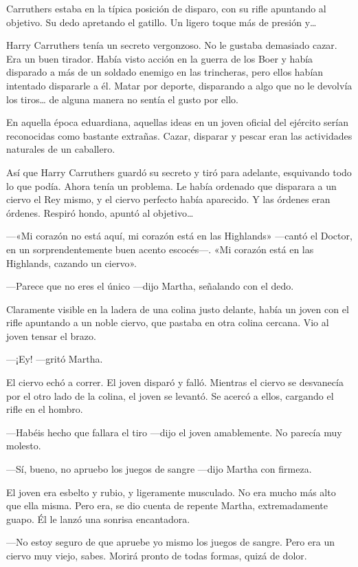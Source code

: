 Carruthers estaba en la típica posición de disparo, con su rifle
apuntando al objetivo. Su dedo apretando el gatillo. Un ligero toque más
de presión y\ldots{}

Harry Carruthers tenía un secreto vergonzoso. No le gustaba demasiado
cazar. Era un buen tirador. Había visto acción en la guerra de los Boer
y había disparado a más de un soldado enemigo en las trincheras, pero
ellos habían intentado dispararle a él. Matar por deporte, disparando a
algo que no le devolvía los tiros\ldots{} de alguna manera no sentía el
gusto por ello.

En aquella época eduardiana, aquellas ideas en un joven oficial del
ejército serían reconocidas como bastante extrañas. Cazar, disparar y
pescar eran las actividades naturales de un caballero.

Así que Harry Carruthers guardó su secreto y tiró para adelante,
esquivando todo lo que podía. Ahora tenía un problema. Le había ordenado
que disparara a un ciervo el Rey mismo, y el ciervo perfecto había
aparecido. Y las órdenes eran órdenes. Respiró hondo, apuntó al
objetivo\ldots{}

---«Mi corazón no está aquí, mi corazón está en las Highlands» ---cantó
el Doctor, en un sorprendentemente buen acento escocés---. «Mi corazón
está en las Highlands, cazando un ciervo».

---Parece que no eres el único ---dijo Martha, señalando con el dedo.

Claramente visible en la ladera de una colina justo delante, había un
joven con el rifle apuntando a un noble ciervo, que pastaba en otra
colina cercana. Vio al joven tensar el brazo.

---¡Ey! ---gritó Martha.

El ciervo echó a correr. El joven disparó y falló. Mientras el ciervo se
desvanecía por el otro lado de la colina, el joven se levantó. Se acercó
a ellos, cargando el rifle en el hombro.

---Habéis hecho que fallara el tiro ---dijo el joven amablemente. No
parecía muy molesto.

---Sí, bueno, no apruebo los juegos de sangre ---dijo Martha con
firmeza.

El joven era esbelto y rubio, y ligeramente musculado. No era mucho más
alto que ella misma. Pero era, se dio cuenta de repente Martha,
extremadamente guapo. Él le lanzó una sonrisa encantadora.

---No estoy seguro de que apruebe yo mismo los juegos de sangre. Pero
era un ciervo muy viejo, sabes. Morirá pronto de todas formas, quizá de
dolor.

